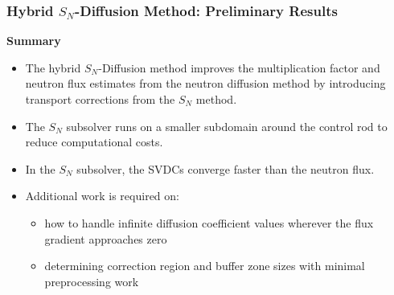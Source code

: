\begin{frame}
  \frametitle{Hybrid $S_N$-Diffusion Method: Preliminary Results}
  \textbf{Summary}
  \vspace{.3cm}
  \begin{itemize}
    \item The hybrid $S_N$-Diffusion method improves the multiplication factor and neutron flux
      estimates from the neutron diffusion method by introducing transport corrections from the
      $S_N$ method.
    \item The $S_N$ subsolver runs on a smaller subdomain around the control rod to reduce
      computational costs.
    \item In the $S_N$ subsolver, the SVDCs converge faster than the neutron flux.
    \item Additional work is required on:
      \begin{itemize}
        \item how to handle infinite diffusion coefficient values wherever the flux gradient
          approaches zero
        \item determining correction region and buffer zone sizes with minimal preprocessing work
      \end{itemize}
  \end{itemize}
\end{frame}
